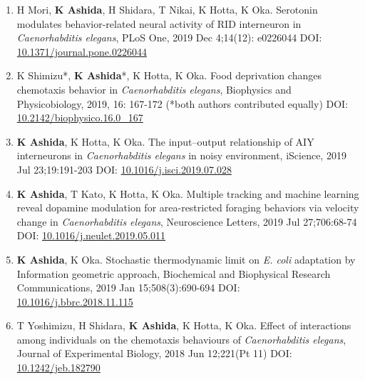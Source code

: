\documentclass[12pt,]{scrartcl}
\begin{document}
\begin{enumerate}
  \leftskip-0.13in %
  \item  H Mori, \textbf{K Ashida}, H Shidara, T Nikai, K Hotta, K Oka. Serotonin modulates behavior-related neural activity of RID interneuron in \textit{Caenorhabditis elegans}, PLoS One, 2019 Dec 4;14(12): e0226044
        DOI: \href{http://dx.doi.org/10.1371/journal.pone.0226044}{10.1371/journal.pone.0226044}
    \item  K Shimizu*, \textbf{K Ashida}*, K Hotta, K Oka. Food deprivation changes chemotaxis behavior in \textit{Caenorhabditis elegans}, Biophysics and Physicobiology, 2019, 16: 167-172 (*both authors contributed equally)
        DOI: \href{http://dx.doi.org/10.2142/biophysico.16.0_167}{10.2142/biophysico.16.0\_167}
    \item \textbf{K Ashida}, K Hotta, K Oka. The input--output relationship of AIY interneurons in \textit{Caenorhabditis elegans} in noisy environment, iScience, 2019 Jul 23;19:191-203
        DOI: \href{http://dx.doi.org/10.1016/j.isci.2019.07.028}{10.1016/j.isci.2019.07.028}
    \item \textbf{K Ashida}, T Kato, K Hotta, K Oka. Multiple tracking and machine learning reveal dopamine modulation for area-restricted foraging behaviors via velocity change in \textit{Caenorhabditis elegans}, Neuroscience Letters, 2019 Jul 27;706:68-74
        DOI: \href{http://dx.doi.org/10.1016/j.neulet.2019.05.011}{10.1016/j.neulet.2019.05.011}
    \item \textbf{K Ashida}, K Oka. Stochastic thermodynamic limit on \textit{E. coli} adaptation by Information geometric approach, Biochemical and Biophysical Research Communications, 2019 Jan 15;508(3):690-694
        DOI: \href{http://dx.doi.org/10.1016/j.bbrc.2018.11.115}{10.1016/j.bbrc.2018.11.115}
    \item T Yoshimizu, H Shidara, \textbf{K Ashida}, K Hotta, K Oka. Effect of interactions among individuals on the chemotaxis behaviours of \textit{Caenorhabditis elegans}, Journal of Experimental Biology, 2018 Jun 12;221(Pt 11)
        DOI: \href{http://dx.doi.org/10.1242/jeb.182790}{10.1242/jeb.182790}
\end{enumerate}
\end{document}
